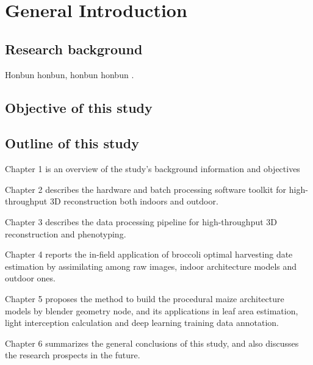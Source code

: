\chapter{General Introduction}

\section{Research background}

Honbun honbun, honbun honbun \citep{guo_deep_2019, zhao_crop_2019}. 


\section{Objective of this study}


\section{Outline of this study}

Chapter 1 is an overview of the study's background information and objectives

Chapter 2 describes the hardware and batch processing software toolkit for high-throughput 3D reconstruction both indoors and outdoor.

Chapter 3 describes the data processing pipeline for high-throughput 3D reconstruction and phenotyping.

Chapter 4 reports the in-field application of broccoli optimal harvesting date estimation by assimilating among raw images, indoor architecture models and outdoor ones.

Chapter 5 proposes the method to build the procedural maize architecture models by blender geometry node, and its applications in leaf area estimation, light interception calculation and deep learning training data annotation.

Chapter 6 summarizes the general conclusions of this study, and also discusses the research prospects in the future.